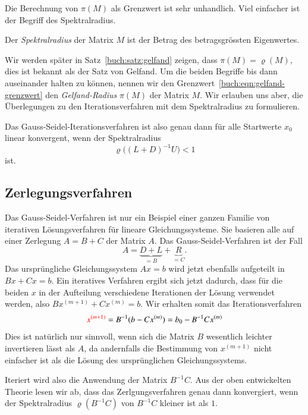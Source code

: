 Die Berechnung von $\pi(M)$ als Grenzwert ist sehr unhandlich.
Viel einfacher ist der Begriff des Spektralradius.
%

\begin{definition}
\label{buch:definition:spektralradius}
Der {\em Spektralradius} der Matrix $M$ ist der Betrag des betragsgrössten
Eigenwertes.
\end{definition}

Wir werden später in Satz~\ref{buch:satz:gelfand} zeigen, dass
$\pi(M) = \varrho(M)$, dies ist bekannt als der Satz von Gelfand.
Um die beiden Begriffe bis dann auseinander halten zu können,
nennen wir den Grenzwert~\ref{buch:eqn:gelfand-grenzwert}
den {\em Gelfand-Radius} $\pi(M)$ der Matrix $M$.
%
Wir erlauben uns aber, die Überlegungen zu den Iterationsverfahren
mit dem Spektralradius zu formulieren.

Das Gauss-Seidel-Iterationsverfahren ist also genau dann für alle
Startwerte $x_0$ linear konvergent, wenn der Spektralradius
\[
\varrho\bigl( (L+D)^{-1}U \bigr) < 1
\]
ist.
%

\subsection{Zerlegungsverfahren
\label{buch:subsection:zerlegung}}
%
Das Gauss-Seidel-Verfahren ist nur ein Beispiel einer ganzen Familie
von iterativen Lösungsverfahren für lineare Gleichungssysteme.
Sie basieren alle auf einer Zerlegung $A=B+C$ der Matrix $A$.
Das Gauss-Seidel-Verfahren ist der Fall
\[
A = \underbrace{D+L}_{\displaystyle = B} + \underbrace{R}_{\displaystyle = C}.
\]
Das ursprüngliche Gleichungssystem $Ax=b$ wird jetzt ebenfalls
aufgeteilt in $Bx+Cx=b$.
Ein iteratives Verfahren ergibt sich jetzt dadurch, dass für die beiden $x$
in der Aufteilung verschiedene Iterationen der Lösung verwendet werden,
also $Bx^{(m+1)} + Cx^{(m)} = b$.
Wir erhalten somit das Iterationsverfahren
\begin{equation}
{\color{red}x^{(m+1)}}
=
B^{-1}(b-Cx^{(m)})
=
b_0 - B^{-1}Cx^{(m)}
\end{equation}
Dies ist natürlich nur sinnvoll, wenn sich die Matrix $B$ wesentlich
leichter invertieren lässt als $A$, da andernfalls die Bestimmung von
$x^{(m+1)}$ nicht einfacher ist als die Lösung des ursprünglichen
Gleichungssystems.

Iteriert wird also die Anwendung der Matrix $B^{-1}C$.
Aus der oben entwickelten Theorie lesen wir ab, dass das Zerlgungsverfahren
genau dann konvergiert, wenn der Spektralradius 
$\varrho(B^{-1}C)$ von $B^{-1}C$ kleiner ist als $1$.

